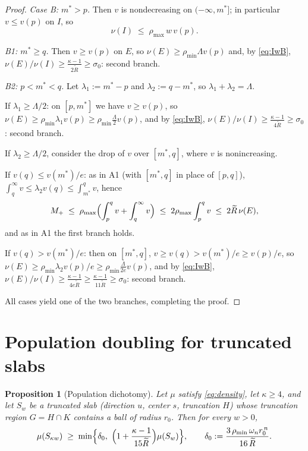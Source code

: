 \documentclass[11pt]{article}
\newtheorem{proposition}[theorem]{Proposition}
\begin{document}
\begin{proof}
\medskip\noindent\emph{Case B: $m^*>p$.}  Then $v$ is nondecreasing on
$(-\infty,m^*]$; in particular $v\le v(p)$ on $I$, so
\begin{equation}\label{eq:IwB}
\nu(I)\;\le\;\rho_{\max}\,w\,v(p).
\end{equation}

\emph{B1: $m^*\ge q$.}  Then $v\ge v(p)$ on $E$, so
$\nu(E)\ge\rho_{\min}\Lambda v(p)$ and, by \eqref{eq:IwB},
$\nu(E)/\nu(I)\ge\frac{\kappa-1}{2\widetilde R}\ge\sigma_0$: second branch.

\emph{B2: $p<m^*<q$.}  Let $\lambda_1:=m^*-p$ and $\lambda_2:=q-m^*$, so
$\lambda_1+\lambda_2=\Lambda$.

If $\lambda_1\ge\Lambda/2$: on $[p,m^*]$ we have $v\ge v(p)$, so
$\nu(E)\ge\rho_{\min}\lambda_1v(p)\ge\rho_{\min}\frac\Lambda2v(p)$, and by
\eqref{eq:IwB}, $\nu(E)/\nu(I)\ge\frac{\kappa-1}{4\widetilde R}\ge\sigma_0$:
second branch.

If $\lambda_2\ge\Lambda/2$, consider the drop of $v$ over $[m^*,q]$, where $v$ is
nonincreasing.

\quad If $v(q)\le v(m^*)/e$: as in A1 (with $[m^*,q]$ in place of $[p,q]$),
$\int_q^\infty v\le\lambda_2v(q)\le\int_{m^*}^qv$, hence
\[
M_+\;\le\;\rho_{\max}\Bigl(\int_p^qv+\int_q^\infty v\Bigr)
\;\le\;2\rho_{\max}\int_p^qv\;\le\;2\widetilde R\,\nu(E),
\]
and as in A1 the first branch holds.

\quad If $v(q)>v(m^*)/e$: then on $[m^*,q]$, $v\ge v(q)>v(m^*)/e\ge v(p)/e$, so
$\nu(E)\ge\rho_{\min}\lambda_2v(p)/e\ge\rho_{\min}\frac{\Lambda}{2e}v(p)$, and by
\eqref{eq:IwB}, $\nu(E)/\nu(I)\ge\frac{\kappa-1}{4e\widetilde R}
\ge\frac{\kappa-1}{11\widetilde R}\ge\sigma_0$: second branch.

\medskip
All cases yield one of the two branches, completing the proof.
\end{proof}

\section{Population doubling for truncated slabs}\label{sec:population}

\begin{proposition}[Population dichotomy]\label{prop:population}
Let $\mu$ satisfy \eqref{eq:density}, let $\kappa\ge4$, and let $S_w$ be a truncated
slab (direction $u$, center $s$, truncation $H$) whose truncation region $G=H\cap K$
contains a ball of radius $r_0$.  Then for every $w>0$,
\[
\mu(S_{\kappa w})\;\ge\;\min\Bigl\{\delta_0,\
\Bigl(1+\frac{\kappa-1}{15\widetilde R}\Bigr)\mu(S_w)\Bigr\},
\qquad
\delta_0:=\frac{3\,\rho_{\min}\,\omega_nr_0^{\,n}}{16\,\widetilde R}.
\]
\end{proposition}
\end{document}

